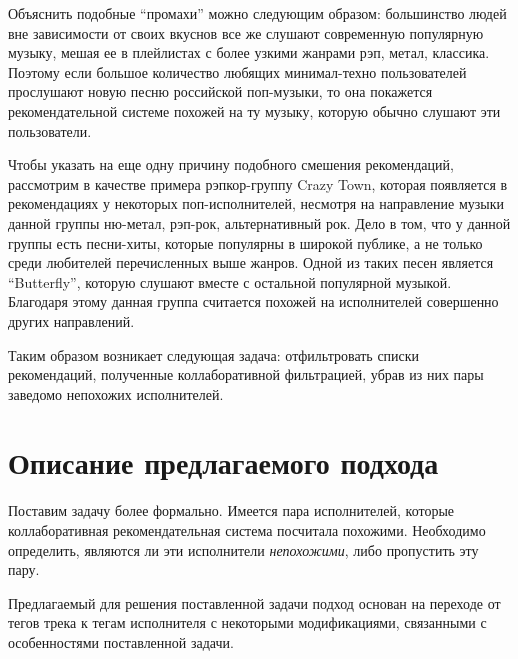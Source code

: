 Объяснить подобные ``промахи'' можно следующим образом: большинство людей вне зависимости от своих вкуснов все же слушают современную популярную
музыку, мешая ее в плейлистах с более узкими жанрами \ld рэп, метал, классика. Поэтому если большое количество любящих минимал-техно пользователей 
прослушают новую песню российской поп-музыки, то она покажется рекомендательной системе похожей на ту музыку, которую обычно слушают эти пользователи. 

Чтобы указать на еще одну причину подобного смешения рекомендаций, рассмотрим в качестве примера рэпкор-группу Crazy Town, которая появляется в 
рекомендациях у некоторых поп-исполнителей, несмотря на направление музыки данной группы \ld ню-метал, рэп-рок, альтернативный рок. Дело в том,
что у данной группы есть песни-хиты, которые популярны в широкой публике, а не только среди любителей перечисленных выше жанров. Одной из таких песен
является ``Butterfly'', которую слушают вместе с остальной популярной музыкой. Благодаря этому данная группа считается похожей на исполнителей
совершенно других направлений.

Таким образом возникает следующая задача: отфильтровать списки рекомендаций, полученные коллаборативной фильтрацией, убрав из них пары заведомо 
непохожих исполнителей.

\section{Описание предлагаемого подхода}

Поставим задачу более формально. Имеется пара исполнителей, которые коллаборативная рекомендательная система посчитала похожими. 
Необходимо определить, являются ли эти исполнители \emph{непохожими}, либо пропустить эту пару. 

Предлагаемый для решения поставленной задачи подход основан на переходе от тегов трека к тегам исполнителя с некоторыми модификациями, 
связанными с особенностями поставленной задачи. 

